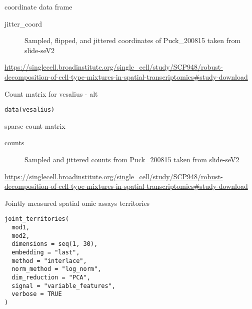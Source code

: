\documentclass[a4paper]{book}
\begin{document}
%
\begin{Format}
coordinate data frame 
\begin{description}

\item[jitter\_coord] Sampled, flipped, and jittered coordinates of Puck\_200815 taken from slide-seV2

\end{description}

\end{Format}
%
\begin{Source}
\url{https://singlecell.broadinstitute.org/single_cell/study/SCP948/robust-decomposition-of-cell-type-mixtures-in-spatial-transcriptomics\#study-download}
\end{Source}
%
\begin{Description}
Count matrix for vesalius - alt
\end{Description}
%
\begin{Usage}
\begin{verbatim}
data(vesalius)
\end{verbatim}
\end{Usage}
%
\begin{Format}
sparse count matrix
\begin{description}

\item[counts] Sampled and jittered counts from Puck\_200815 taken from slide-seV2

\end{description}

\end{Format}
%
\begin{Source}
\url{https://singlecell.broadinstitute.org/single_cell/study/SCP948/robust-decomposition-of-cell-type-mixtures-in-spatial-transcriptomics\#study-download}
\end{Source}
%
\begin{Description}
Jointly measured spatial omic assays territories
\end{Description}
%
\begin{Usage}
\begin{verbatim}
joint_territories(
  mod1,
  mod2,
  dimensions = seq(1, 30),
  embedding = "last",
  method = "interlace",
  norm_method = "log_norm",
  dim_reduction = "PCA",
  signal = "variable_features",
  verbose = TRUE
)
\end{verbatim}
\end{Usage}
\end{document}
